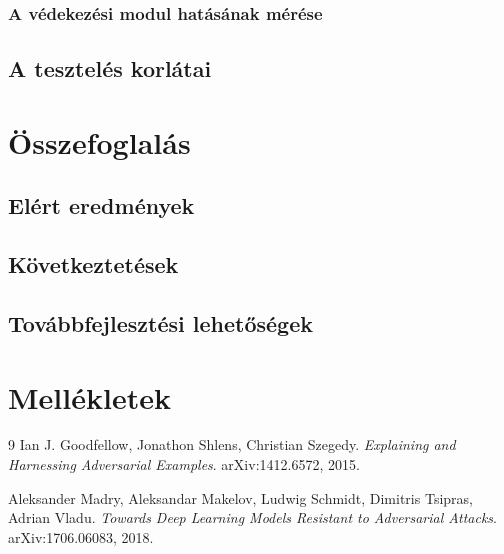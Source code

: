 \documentclass[12pt,a4paper]{article}
\begin{document}
\subsubsection{A védekezési modul hatásának mérése}

\subsection{A tesztelés korlátai}

\newpage
\section{Összefoglalás}

\subsection{Elért eredmények}

\subsection{Következtetések}

\subsection{Továbbfejlesztési lehetőségek}

\newpage
\section*{Mellékletek}

\newpage

\begin{thebibliography}{9}
Ian J. Goodfellow, Jonathon Shlens, Christian Szegedy.
\textit{Explaining and Harnessing Adversarial Examples}.
arXiv:1412.6572, 2015.

Aleksander Madry, Aleksandar Makelov, Ludwig Schmidt, Dimitris Tsipras, Adrian Vladu.
\textit{Towards Deep Learning Models Resistant to Adversarial Attacks}.
arXiv:1706.06083, 2018.
\end{thebibliography}
\end{document}
